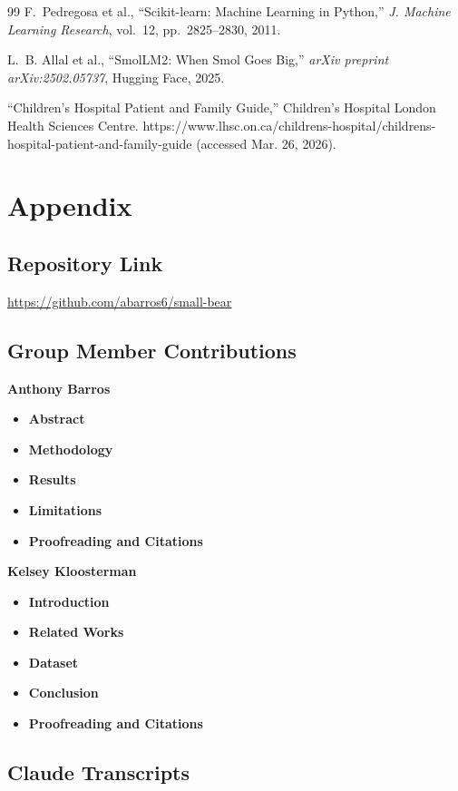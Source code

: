 \documentclass[journal]{IEEEtai}
\begin{document}
\begin{thebibliography}{99}
F.~Pedregosa et al., ``Scikit-learn: Machine Learning in Python,'' \textit{J. Machine Learning Research}, vol.~12, pp.~2825--2830, 2011.

L.~B. Allal et al., ``SmolLM2: When Smol Goes Big,'' \textit{arXiv preprint arXiv:2502.05737}, Hugging Face, 2025.

“Children's Hospital Patient and Family Guide,” Children's Hospital London Health Sciences Centre. https://www.lhsc.on.ca/childrens-hospital/childrens-hospital-patient-and-family-guide (accessed Mar. 26, 2026).

\end{thebibliography}

\clearpage
\section*{Appendix}

\subsection{Repository Link}
\noindent \url{https://github.com/abarros6/small-bear}

\subsection{Group Member Contributions}
\textbf{Anthony Barros}
\begin{itemize}
    \item \textbf{Abstract}
    \item \textbf{Methodology} 
    \item \textbf{Results}
    \item \textbf{Limitations}
    \item \textbf{Proofreading and Citations}
\end{itemize}

\textbf{Kelsey Kloosterman}
\begin{itemize}
    \item \textbf{Introduction}
    \item \textbf{Related Works} 
    \item \textbf{Dataset} 
    \item \textbf{Conclusion}
    \item \textbf{Proofreading and Citations}
\end{itemize}


\subsection{Claude Transcripts}
\end{document}
